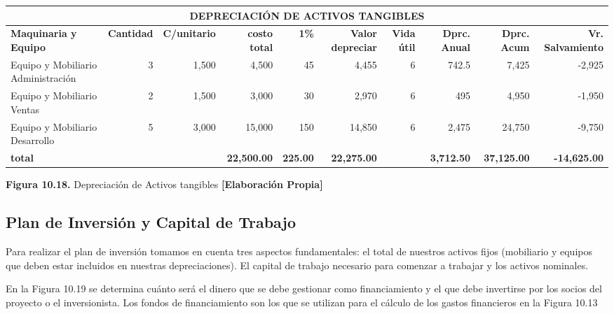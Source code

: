 \begin{table}[H]
\centering
\scriptsize
\renewcommand{\arraystretch}{1.15}
\setlength{\tabcolsep}{4pt}
\begin{tabular}{|l|r|r|r|r|r|r|r|r|r|}
\hline
\multicolumn{10}{|c|}{\textbf{DEPRECIACIÓN DE ACTIVOS TANGIBLES}} \\ \hline
\textbf{Maquinaria y Equipo} & \textbf{Cantidad} & \textbf{C/unitario} & \textbf{costo total} & \textbf{1\%} & \textbf{Valor depreciar} & \textbf{Vida útil} & \textbf{Dprc. Anual} & \textbf{Dprc. Acum} & \textbf{Vr. Salvamiento} \\ \hline
Equipo y Mobiliario Administración & 3 & 1,500 & 4,500 & 45 & 4,455 & 6 & 742.5 & 7,425 & -2,925 \\ \hline
Equipo y Mobiliario Ventas & 2 & 1,500 & 3,000 & 30 & 2,970 & 6 & 495 & 4,950 & -1,950 \\ \hline
Equipo y Mobiliario Desarrollo & 5 & 3,000 & 15,000 & 150 & 14,850 & 6 & 2,475 & 24,750 & -9,750 \\ \hline
\textbf{total} &  &  & \textbf{22,500.00} & \textbf{225.00} & \textbf{22,275.00} &  & \textbf{3,712.50} & \textbf{37,125.00} & \textbf{-14,625.00} \\ \hline
\end{tabular}

\vspace{0.2cm}
\textbf{Figura 10.18.} Depreciación de Activos tangibles \textbf{[Elaboración Propia]}
\end{table}

\subsection{Plan de Inversión y Capital de Trabajo}

Para realizar el plan de inversión tomamos en cuenta tres aspectos fundamentales: el total de nuestros activos fijos (mobiliario y equipos que deben estar incluidos en nuestras depreciaciones). El capital de trabajo necesario para comenzar a trabajar y los activos nominales.

En la Figura 10.19 se determina cuánto será el dinero que se debe gestionar como financiamiento y el que debe invertirse por los socios del proyecto o el inversionista. Los fondos de financiamiento son los que se utilizan para el cálculo de los gastos financieros en la Figura 10.13

